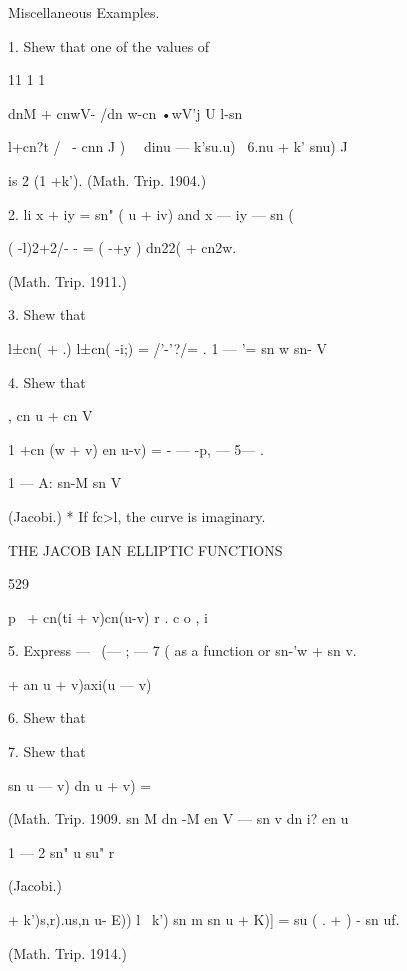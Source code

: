 Miscellaneous Examples.

1. Shew that one of the values of



11 1 1

dnM + cnwV- /dn w-cn •wV'j U l-sn%

l+cn?t / \ - cnn J ) \ \ dinu — k'su.u) \ 6.nu + k' snu) J



is 2 (1 +k'). (Math. Trip. 1904.)

2. li x + iy = sn" ( u + iv) and x — iy — sn (%

 ( -l)2+2/- - = ( -+y ) dn22( + cn2w.

(Math. Trip. 1911.)

3. Shew that

 l±cn( + .) l±cn( -i;) = /'-'?/= . 1 — '= sn w sn- V

4. Shew that

, cn u + cn V

1 +cn (w + v) en u-v) = - — -p, — 5— .

  1 — A: sn-M sn V

(Jacobi.) * If fc>l, the curve is imaginary.



THE JACOB IAN ELLIPTIC FUNCTIONS



529



p \ + cn(ti + v)cn(u-v) r . c o , i

5. Express — \ (— ; — 7 ( as a function or sn-'w + sn v.

   + an u + v)axi(u — v)



6. Shew that



7. Shew that



sn u — v) dn u + v) =



(Math. Trip. 1909. sn M dn -M en V — sn v dn i? en u



1 — 2 sn" u su" r



(Jacobi.)



    + k')s,r).us,n u- E)) l~ k') sn m sn u + K)] = su ( . + ) - sn uf.

(Math. Trip. 1914.)




